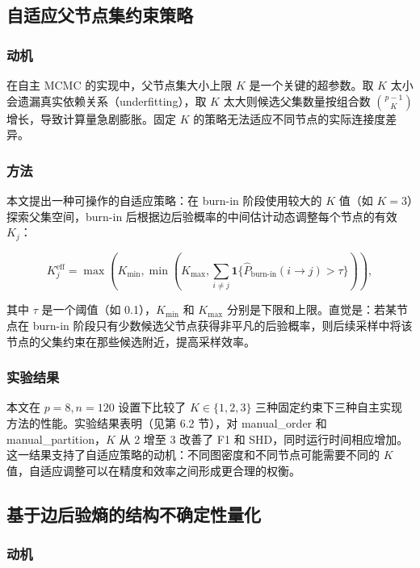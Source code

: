 \documentclass[UTF8,a4paper,12pt]{ctexart}
\begin{document}
\subsection{自适应父节点集约束策略}

\subsubsection{动机}

在自主 MCMC 的实现中，父节点集大小上限 $K$ 是一个关键的超参数。取 $K$ 太小会遗漏真实依赖关系（underfitting），取 $K$ 太大则候选父集数量按组合数 $\binom{p-1}{K}$ 增长，导致计算量急剧膨胀。固定 $K$ 的策略无法适应不同节点的实际连接度差异。

\subsubsection{方法}

本文提出一种可操作的自适应策略：在 burn-in 阶段使用较大的 $K$ 值（如 $K=3$）探索父集空间，burn-in 后根据边后验概率的中间估计动态调整每个节点的有效 $K_j$：

\begin{equation}
K_j^{\text{eff}} = \max\left(K_{\min}, \min\left(K_{\max}, \sum_{i \neq j} \mathbf{1}\{\hat{P}_{\text{burn-in}}(i \to j) > \tau\}\right)\right),
\end{equation}

其中 $\tau$ 是一个阈值（如 0.1），$K_{\min}$ 和 $K_{\max}$ 分别是下限和上限。直觉是：若某节点在 burn-in 阶段只有少数候选父节点获得非平凡的后验概率，则后续采样中将该节点的父集约束在那些候选附近，提高采样效率。

\subsubsection{实验结果}

本文在 $p=8, n=120$ 设置下比较了 $K \in \{1, 2, 3\}$ 三种固定约束下三种自主实现方法的性能。实验结果表明（见第 6.2 节），对 manual\_order 和 manual\_partition，$K$ 从 2 增至 3 改善了 F1 和 SHD，同时运行时间相应增加。这一结果支持了自适应策略的动机：不同图密度和不同节点可能需要不同的 $K$ 值，自适应调整可以在精度和效率之间形成更合理的权衡。

\subsection{基于边后验熵的结构不确定性量化}

\subsubsection{动机}
\end{document}

